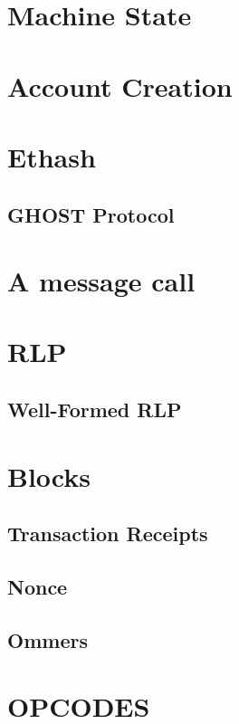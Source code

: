 \documentclass[11pt,a4paper,leqno,bibliography=totoc]{scrartcl}
\newenvironment{alphafootnotes}
    {\par\edef\savedfootnotenumber{\number\value{footnote}}
    \renewcommand{\thefootnote}{\alph{footnote}}
     \setcounter{footnote}{0}}
    {\par\setcounter{footnote}{\savedfootnotenumber}}
\begin{document}
\begin{alphafootnotes}
\begin{multicols}{2}
    \section{Machine State}


    \section{Account Creation}
\section{Ethash}
\subsection{GHOST Protocol}


    \section{A message call}

    \section{RLP}
    \subsection{Well-Formed RLP}
    \section{Blocks}

    \subsection{Transaction Receipts}



    \subsection{Nonce}

    \subsection{Ommers}

\section{OPCODES}


\end{multicols}
\end{alphafootnotes}
\end{document}
